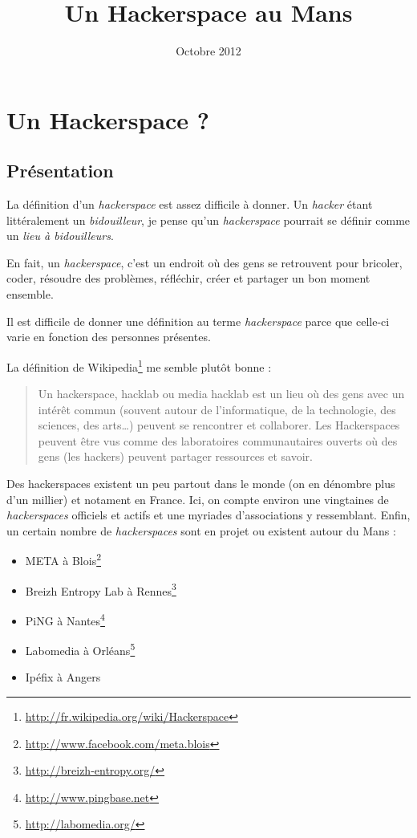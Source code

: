 \documentclass[a4paper, 11pt]{report}
\title{Un Hackerspace au Mans}
\author{}
\date{Octobre 2012}
\newcommand{\hs}{{\itshape hackerspace}}
\newcommand{\hsss}{{\itshape hackerspaces}}
\begin{document}
    \maketitle

    \tableofcontents
    \newpage

    \section{Un Hackerspace ?}

    \subsection{Présentation}

La définition d'un \hs{} est assez difficile à donner. Un {\it hacker} étant littéralement un {\it bidouilleur}, je
pense qu'un \hs{} pourrait se définir comme un {\it lieu à bidouilleurs}.

En fait, un \hs, c'est un endroit où des gens se retrouvent pour bricoler, coder, résoudre des problèmes, réfléchir,
créer et partager un bon moment ensemble.

Il est difficile de donner une définition au terme \hs{} parce que celle-ci varie en fonction des personnes
présentes.

La définition de Wikipedia\footnote{\url{http://fr.wikipedia.org/wiki/Hackerspace}} me semble plutôt bonne :

\begin{quotation}
Un hackerspace, hacklab ou media hacklab est un lieu où des gens avec un intérêt commun (souvent autour de
l'informatique, de la technologie, des sciences, des arts\ldots) peuvent se rencontrer et collaborer. Les Hackerspaces
peuvent être vus comme des laboratoires communautaires ouverts où des gens (les hackers) peuvent partager ressources
et savoir.
\end{quotation}

Des hackerspaces existent un peu partout dans le monde (on en dénombre plus d'un millier) et notament en France.
Ici, on compte environ une vingtaines de \hsss{} officiels et actifs et une myriades d'associations y ressemblant.
Enfin, un certain nombre de \hsss{} sont en projet ou existent autour du Mans :

\begin{itemize}
    \item META à Blois\footnote{\url{http://www.facebook.com/meta.blois}}
    \item Breizh Entropy Lab à Rennes\footnote{\url{http://breizh-entropy.org/}}
    \item PiNG à Nantes\footnote{\url{http://www.pingbase.net}}
    \item Labomedia à Orléans\footnote{\url{http://labomedia.org/}}
    \item Ipéfix à Angers
\end{itemize}
\end{document}
